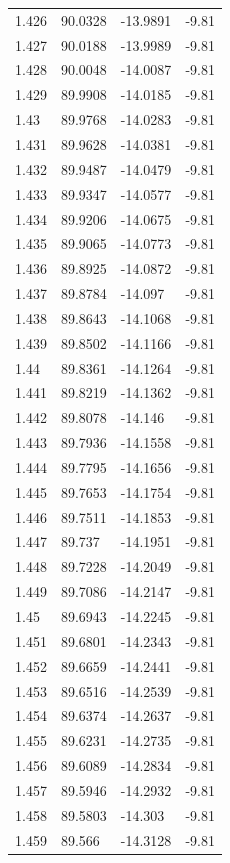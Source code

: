 \begin{tabular}{llll}
1.426 & 90.0328 & -13.9891 & -9.81 \\
1.427 & 90.0188 & -13.9989 & -9.81 \\
1.428 & 90.0048 & -14.0087 & -9.81 \\
1.429 & 89.9908 & -14.0185 & -9.81 \\
1.43 & 89.9768 & -14.0283 & -9.81 \\
1.431 & 89.9628 & -14.0381 & -9.81 \\
1.432 & 89.9487 & -14.0479 & -9.81 \\
1.433 & 89.9347 & -14.0577 & -9.81 \\
1.434 & 89.9206 & -14.0675 & -9.81 \\
1.435 & 89.9065 & -14.0773 & -9.81 \\
1.436 & 89.8925 & -14.0872 & -9.81 \\
1.437 & 89.8784 & -14.097 & -9.81 \\
1.438 & 89.8643 & -14.1068 & -9.81 \\
1.439 & 89.8502 & -14.1166 & -9.81 \\
1.44 & 89.8361 & -14.1264 & -9.81 \\
1.441 & 89.8219 & -14.1362 & -9.81 \\
1.442 & 89.8078 & -14.146 & -9.81 \\
1.443 & 89.7936 & -14.1558 & -9.81 \\
1.444 & 89.7795 & -14.1656 & -9.81 \\
1.445 & 89.7653 & -14.1754 & -9.81 \\
1.446 & 89.7511 & -14.1853 & -9.81 \\
1.447 & 89.737 & -14.1951 & -9.81 \\
1.448 & 89.7228 & -14.2049 & -9.81 \\
1.449 & 89.7086 & -14.2147 & -9.81 \\
1.45 & 89.6943 & -14.2245 & -9.81 \\
1.451 & 89.6801 & -14.2343 & -9.81 \\
1.452 & 89.6659 & -14.2441 & -9.81 \\
1.453 & 89.6516 & -14.2539 & -9.81 \\
1.454 & 89.6374 & -14.2637 & -9.81 \\
1.455 & 89.6231 & -14.2735 & -9.81 \\
1.456 & 89.6089 & -14.2834 & -9.81 \\
1.457 & 89.5946 & -14.2932 & -9.81 \\
1.458 & 89.5803 & -14.303 & -9.81 \\
1.459 & 89.566 & -14.3128 & -9.81 \\

\end{tabular}
